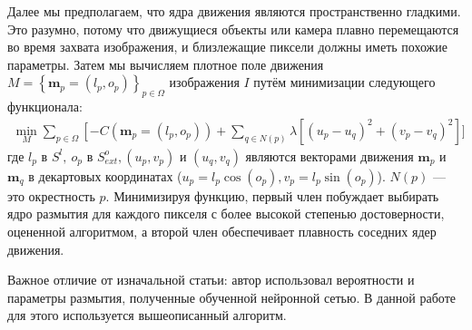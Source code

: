 Далее мы предполагаем, что ядра движения являются пространственно
гладкими. Это разумно, потому что движущиеся объекты или камера плавно перемещаются во время захвата изображения, и близлежащие пиксели должны иметь похожие параметры. Затем мы вычисляем плотное поле движения $M=\left\{\mathbf{m}_{p}=\left(l_{p}, o_{p}\right)\right\}_{p \in \Omega}$ изображения $I$ путём минимизации следующего функционала:
$$
\begin{gathered}
\min _{M} \sum_{p \in \Omega}\left[-C\left(\mathbf{m}_{p}=\left(l_{p}, o_{p}\right)\right)+\right. 
\sum_{q \in N(p)} \lambda\left[\left(u_{p}-u_{q}\right)^{2}+\left(v_{p}-v_{q}\right)^{2}\right] ]
\end{gathered}
$$
где $l_{p}$ в  $S^{l},\ o_{p}$ в $S_{e x t}^{o},\left(u_{p}, v_{p}\right)$ и $\left(u_{q}, v_{q}\right)$ являются векторами движения $\mathbf{m}_{p}$ и $\mathbf{m}_{q}$ в декартовых координатах ($u_{p}=l_{p} \cos \left(o_{p}\right), v_{p}=l_{p} \sin \left(o_{p}\right)$). $N(p)$ --- это окрестность $p$. Минимизируя функцию, первый член побуждает выбирать ядро размытия для каждого пикселя с более высокой степенью достоверности, оцененной алгоритмом, а второй член обеспечивает плавность соседних ядер движения.

Важное отличие от изначальной статьи: автор использовал вероятности и параметры размытия, полученные обученной нейронной сетью. В данной работе для этого используется вышеописанный алгоритм.


